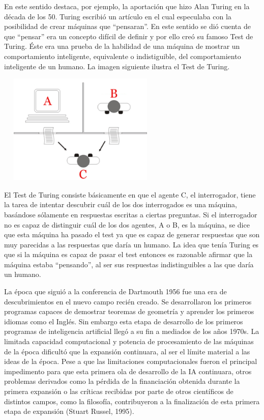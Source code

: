 \documentclass[]{DissertateUSU}
\begin{document}
\noindent En este sentido destaca, por ejemplo, la aportación que hizo
Alan Turing en la década de los 50. Turing escribió un artículo en el
cual especulaba con la posibilidad de crear máquinas que ``pensaran''.
En este sentido se dió cuenta de que ``pensar'' era un concepto difícil
de definir y por ello creó su famoso Test de Turing. Éste era una prueba
de la habilidad de una máquina de mostrar un comportamiento inteligente,
equivalente o indistiguible, del comportamiento inteligente de un
humano. La imagen siguiente ilustra el Test de Turing.

\centering

\includegraphics[width=3.125in,height=2.08333in]{Turing_test_diagram.png}
\centering
{}

\setlength\parskip{5ex}
\justifying

\noindent El Test de Turing consiste básicamente en que el agente C, el
interrogador, tiene la tarea de intentar descubrir cuál de los dos
interrogados es una máquina, basándose sólamente en respuestas escritas
a ciertas preguntas. Si el interrogador no es capaz de distinguir cuál
de los dos agentes, A o B, es la máquina, se dice que esta máquina ha
pasado el test ya que es capaz de generar respuestas que son muy
parecidas a las respuestas que daría un humano. La idea que tenía Turing
es que si la máquina es capaz de pasar el test entonces es razonable
afirmar que la máquina estaba ``pensando'', al ser sus respuestas
indistinguibles a las que daría un humano.

\noindent La época que siguió a la conferencia de Dartmouth 1956 fue una
era de descubrimientos en el nuevo campo recién creado. Se desarrollaron
los primeros programas capaces de demostrar teoremas de geometría y
aprender los primeros idiomas como el Inglés. Sin embargo esta etapa de
desarrollo de los primeros programas de inteligencia artificial llegó a
su fin a mediados de los años 1970s. La limitada capacidad computacional
y potencia de procesamiento de las máquinas de la época dificultó que la
expansión continuara, al ser el límite material a las ideas de la época.
Pese a que las limitaciones computacionales fueron el principal
impedimento para que esta primera ola de desarrollo de la IA continuara,
otros problemas derivados como la pérdida de la financiación obtenida
durante la primera expansión o las críticas recibidas por parte de otros
científicos de distintos campos, como la filosofía, contribuyeron a la
finalización de esta primera etapa de expansión (Stuart Russel, 1995).
\end{document}
